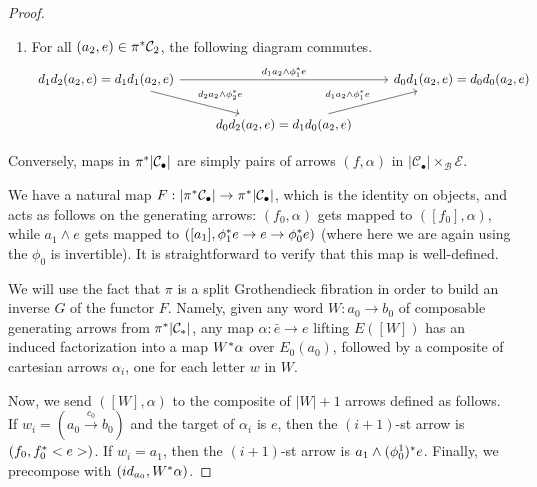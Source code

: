\documentclass[a4paper,10pt
,draft
]{article}%
\renewcommand{\1}{\eta}%
\begin{document}
\begin{proof}
{\begin{enumerate}[label = (\roman*)]
        \item For all $(a_2, e) \in \pi^{\**} \mathcal C_2$, the following diagram commutes.
              \begin{equation}
                    \begin{tikzcd}
                          d_1 d_2 (a_2, e) = d_1 d_1 (a_2, e) \arrow[rr, "d_1 a_2 \wedge \phi_1^{\**} e"] \arrow[dr, "d_2 a_2 \wedge \phi_2^{\**} e"]
                          &&
                          d_0 d_1(a_2, e) = d_0 d_0(a_2, e)
                          \\
                          &
                          d_0 d_2 (a_2, e) = d_1 d_0 (a_2, e) \arrow[ur, "d_1 a_2 \wedge \phi_1^{\**} e"]
                    \end{tikzcd}
              \end{equation}
        \end{enumerate}
      }

      Conversely, maps in $\pi^{\**}|\mathcal C_\bullet|$ are simply pairs of arrows $(f, \alpha)$ in $|\mathcal C_\bullet| \times_{\mathcal B} \mathcal E$.

      We have a natural map $F: |\pi^{\**} \mathcal C_\bullet| \to \pi^{\**} |\mathcal C_\bullet|$, which is the identity on objects,
      and acts as follows on the generating arrows:
      $(f_0, \alpha)$ gets mapped to $([f_0], \alpha)$, while
      $a_1 \wedge e$ gets mapped to $([a_1], \phi_1^{\**} e \to e \to \phi_0^{\**} e)$
      (where here we are again using the $\phi_0$ is invertible).
      It is straightforward to verify that this map is well-defined.      

      We will use the fact that $\pi$ is a split Grothendieck fibration in order to build an inverse $G$ of the functor $F$.
      Namely, given any word $W: a_0 \to b_0$ of composable generating arrows from $\pi^{\**}|\mathcal C_{\**}|$,
      any map $\alpha: \bar e \to e$ lifting $E([W])$ has an induced factorization into
      a map $W^{\**}\alpha$ over $E_0(a_0)$, followed by a composite of cartesian arrows $\alpha_i$, one for each letter $w$ in $W$.

      Now, we send $([W],\alpha)$ to the composite of $|W|+1$ arrows defined as follows.
      If $w_i = (a_0 \xrightarrow{c_0} b_0)$ and the target of $\alpha_i$ is $e$, then the $(i+1)$-st arrow is $(f_0, f_0^{\**}<e>)$.
      If $w_i = a_1$, then the $(i+1)$-st arrow is $a_1 \wedge (\phi_0^{\-1})^{\**} e$.
      Finally, we precompose with $(id_{a_0}, W^{\**}\alpha)$.


\end{proof}
\end{document}

